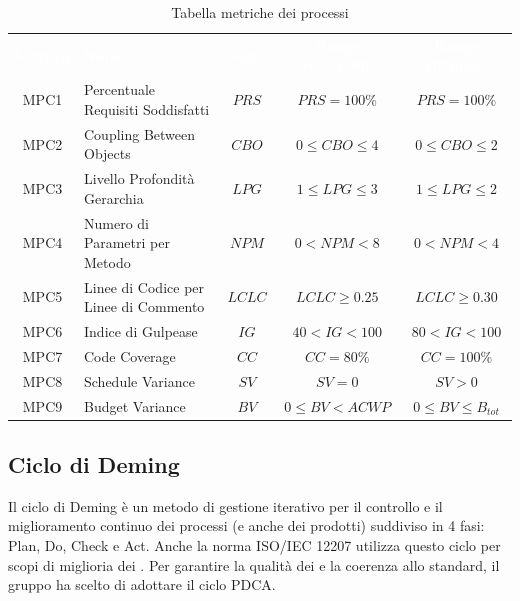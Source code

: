     \renewcommand{\arraystretch}{1.5}
    \begin{longtable}{ c C{4cm} c c c}
    \caption{Tabella metriche dei processi}\\
    \textcolor{white}{\textbf{Metrica}} & \textcolor{white}{\textbf{Nome}} & \textcolor{white}{\textbf{Sigla}} & \textcolor{white}{\textbf{Range Accettabile}} & \textcolor{white}{\textbf{Range Ottimale}}\\
    MPC1 & Percentuale Requisiti Soddisfatti & $PRS$ & $PRS = 100\%$ & $PRS = 100\%$ \\
    MPC2 & Coupling Between Objects & $CBO$ & $0 \leq CBO \leq 4$ & $0 \leq CBO \leq 2$ \\
    MPC3 & Livello Profondità Gerarchia & $LPG$ &  $1 \leq LPG \leq 3$ &  $1 \leq LPG \leq 2$ \\
    MPC4 & Numero di Parametri per Metodo & $NPM$ & $0 < NPM < 8$ & $ 0 < NPM < 4$ \\
    MPC5 & Linee di Codice per Linee di Commento & $LCLC$ & $LCLC \geq 0.25$ & $LCLC \geq 0.30$ \\
    MPC6 & Indice di Gulpease & $IG$ & $40 < IG < 100$ & $80 < IG < 100$ \\
    MPC7 & Code Coverage & $CC$ & $CC = 80\%$ & $CC = 100\%$  \\
    MPC8 & Schedule Variance & $SV$ & $SV = 0$ & $SV > 0$  \\	
    MPC9 & Budget Variance & $BV$ & $0 \leq BV < ACWP$ & $0 \leq BV \leq B_{tot}$  \\
    \end{longtable}

\subsection{Ciclo di Deming}
Il ciclo di Deming è un metodo di gestione iterativo per il controllo e il miglioramento continuo dei processi (e anche dei prodotti) suddiviso in 4 fasi: Plan, Do, Check e Act. 
Anche la norma ISO/IEC 12207 utilizza questo ciclo per scopi di miglioria dei . Per garantire la qualità dei  e la coerenza allo standard, il gruppo \Gruppo  
ha scelto di adottare il ciclo PDCA.


